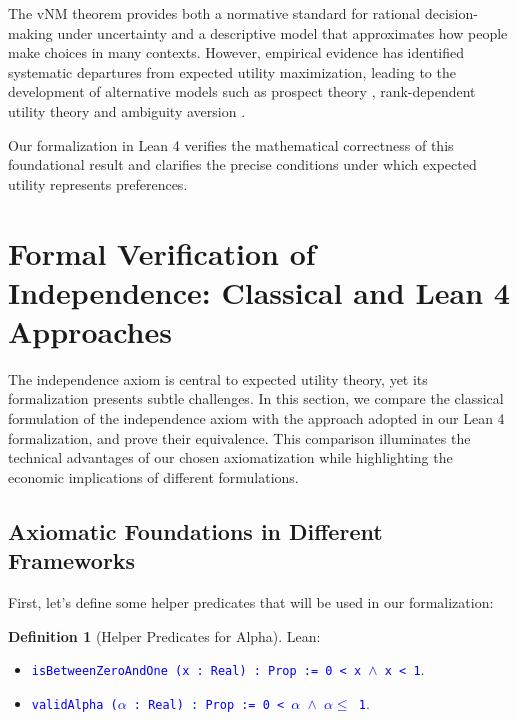 \documentclass{article}
\theoremstyle{definition}
\newtheorem{definition}{Definition}[section]
\newcommand{\tactic}[1]{\textcolor{blue}{\texttt{#1}}}
\begin{document}
The vNM theorem provides both a normative standard for rational decision-making under uncertainty and a descriptive model that approximates how people make choices in many contexts. However, empirical evidence has identified systematic departures from expected utility maximization, leading to the development of alternative models such as prospect theory \cite{KahnemenTversky1979}\cite{TverskyKahneman1992}\cite{Wakker2010}\cite{Barberis2013}\cite{StarmHe2019}, rank-dependent utility theory\cite{Quiggin1982}\cite{ChewRDU1983}\cite{Yaari1987}\cite{Quiggin1993}\cite{AbdellaoiRDU2007}\cite{DieciergardRDU2018}\cite{Wang2022} and ambiguity aversion\cite{ellsberg1961}\cite{gilboa1989}\cite{schmeidler1989}\cite{epstein2003}\cite{ghirardato2004}\cite{marinacci2004}\cite{klibanoff2005}
\cite{hansen2008}\cite{cerreia2011}\cite{strzalecki2011}\cite{machina2014}\cite{baillon2018}\cite{baillon2022}\cite{baillon_forthcoming}.

Our formalization in Lean 4 verifies the mathematical correctness of this foundational result and clarifies the precise conditions under which expected utility represents preferences.

\section{Formal Verification of Independence: Classical and Lean 4 Approaches}\label{sec: indep}

The independence axiom is central to expected utility theory, yet its formalization presents subtle challenges. In this section, we compare the classical formulation of the independence axiom with the approach adopted in our Lean 4 formalization, and prove their equivalence. This comparison illuminates the technical advantages of our chosen axiomatization while highlighting the economic implications of different formulations.

\subsection{Axiomatic Foundations in Different Frameworks}

First, let's define some helper predicates that will be used in our formalization:

\begin{definition}[Helper Predicates for Alpha]
Lean:
\begin{itemize}
    \item \tactic{isBetweenZeroAndOne (x : Real) : Prop := 0 < x $\wedge$ x < 1}.
    \item \tactic{validAlpha ($\alpha$ : Real) : Prop := 0 < $\alpha$ $\wedge$ $\alpha\leq$ 1}.
\end{itemize}
\end{definition}
\end{document}
